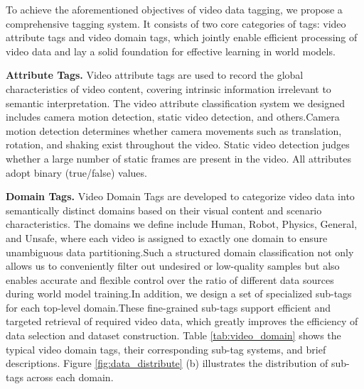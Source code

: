 \documentclass{llmxive}
\begin{document}
To achieve the aforementioned objectives of video data tagging, we propose a comprehensive tagging system. It consists of two core categories of tags: video attribute tags and video domain tags, which jointly enable efficient processing of video data and lay a solid foundation for effective learning in world models.

\textbf{Attribute Tags.} Video attribute tags are used to record the global characteristics of video content, covering intrinsic information irrelevant to semantic interpretation. The video attribute classification system we designed includes camera motion detection, static video detection, and others.Camera motion detection determines whether camera movements such as translation, rotation, and shaking exist throughout the video. Static video detection judges whether a large number of static frames are present in the video. All attributes adopt binary (true/false) values.



\textbf{Domain Tags.} Video Domain Tags are developed to categorize video data into semantically distinct domains based on their visual content and scenario characteristics. The domains we define include Human, Robot, Physics, General, and Unsafe, where each video is assigned to exactly one domain to ensure unambiguous data partitioning.Such a structured domain classification not only allows us to conveniently filter out undesired or low-quality samples but also enables accurate and flexible control over the ratio of different data sources during world model training.In addition, we design a set of specialized sub-tags for each top-level domain.These fine-grained sub-tags support efficient and targeted retrieval of required video data, which greatly improves the efficiency of data selection and dataset construction. Table \ref{tab:video_domain} shows the typical video domain tags, their corresponding sub-tag systems, and brief descriptions. Figure \ref{fig:data_distribute} (b) illustrates the distribution of sub-tags across each domain.
\end{document}
